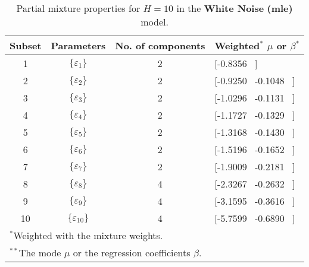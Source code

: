 \footnotesize{  
{ \renewcommand{\arraystretch}{1.3} 
\begin{longtable}{cccp{3.6cm}} 
\caption{Partial mixture properties for $H=10$ in the \textbf{White Noise} \textbf{(mle)} model.} 
\label{tab:pmits_WN_ML} \\ 
 Subset & Parameters & No. of components  & Weighted$^{*}$ $\mu$ or $\beta$$^{*}$ \\ \hline 
1 & $\{\varepsilon_{1}\}$ & 2 & [-0.8356 \, ]   \\ [1ex] 
2 & $\{\varepsilon_{2}\}$ & 2 & [-0.9250 \, -0.1048 \, ]   \\ [1ex] 
3 & $\{\varepsilon_{3}\}$ & 2 & [-1.0296 \, -0.1131 \, ]   \\ [1ex] 
4 & $\{\varepsilon_{4}\}$ & 2 & [-1.1727 \, -0.1329 \, ]   \\ [1ex] 
5 & $\{\varepsilon_{5}\}$ & 2 & [-1.3168 \, -0.1430 \, ]   \\ [1ex] 
6 & $\{\varepsilon_{6}\}$ & 2 & [-1.5196 \, -0.1652 \, ]   \\ [1ex] 
7 & $\{\varepsilon_{7}\}$ & 2 & [-1.9009 \, -0.2181 \, ]   \\ [1ex] 
8 & $\{\varepsilon_{8}\}$ & 4 & [-2.3267 \, -0.2632 \, ]   \\ [1ex] 
9 & $\{\varepsilon_{9}\}$ & 4 & [-3.1595 \, -0.3616 \, ]   \\ [1ex] 
10 & $\{\varepsilon_{10}\}$ & 4 & [-5.7599 \, -0.6890 \, ]   \\ [1ex] 
\hline 
 \multicolumn{4}{l}{\footnotesize{$^{*}$Weighted with the mixture weights.}} \\ 
 \multicolumn{4}{l}{\footnotesize{$^{**}$The mode $\mu$ or the regression coefficients $\beta$.}} \\ 
\end{longtable} 
} 
} 
